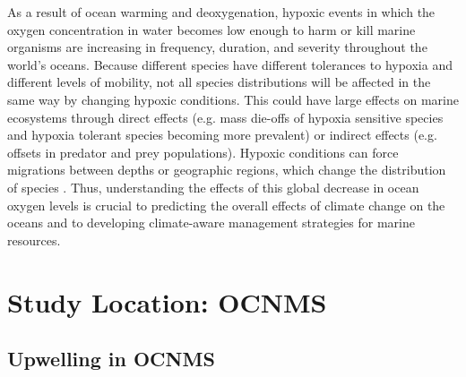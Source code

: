 \documentclass[12pt,twoside]{reedthesis}
\begin{document}
As a result of ocean warming and deoxygenation, hypoxic events in which the oxygen concentration in water becomes low enough to harm or kill marine organisms are increasing in frequency, duration, and severity throughout the world's oceans. Because different species have different tolerances to hypoxia and different levels of mobility, not all species distributions will be affected in the same way by changing hypoxic conditions. This could have large effects on marine ecosystems through direct effects (e.g. mass die-offs of hypoxia sensitive species and hypoxia tolerant species becoming more prevalent) or indirect effects (e.g. offsets in predator and prey populations). Hypoxic conditions can force migrations between depths or geographic regions, which change the distribution of species \autocite{Deutsch2023, Pihl1991}. Thus, understanding the effects of this global decrease in ocean oxygen levels is crucial to predicting the overall effects of climate change on the oceans and to developing climate-aware management strategies for marine resources. 

\section{Study Location: OCNMS}

\subsection{Upwelling in OCNMS}
\end{document}
